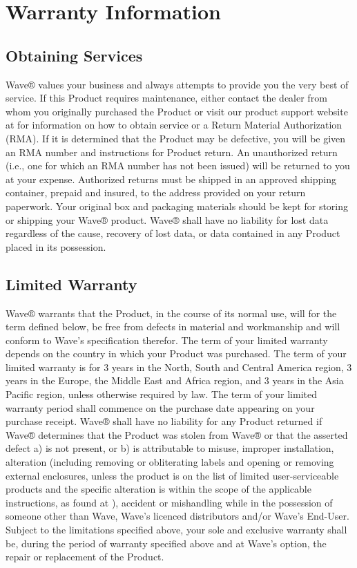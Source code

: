 \documentclass[letterpaper,10pt,english]{sphinxmanual}
\begin{document}
\section{Warranty Information}
\label{\detokenize{warranty:warranty-information}}

\subsection{Obtaining Services}
\label{\detokenize{warranty:obtaining-services}}
Wave® values your business and always attempts to provide you the very best of service. If this Product requires maintenance, either contact the dealer from whom you originally purchased the Product or visit our product support website at  for information on how to obtain service or a Return Material Authorization (RMA). If it is determined that the Product may be defective, you will be given an RMA number and instructions for Product return. An unauthorized return (i.e., one for which an RMA number has not been issued) will be returned to you at your expense. Authorized returns must be shipped in an approved shipping container, prepaid and insured, to the address provided on your return paperwork. Your original box and packaging materials should be kept for storing or shipping your Wave® product.  Wave® shall have no liability for lost data regardless of the cause, recovery of lost data, or data contained in any Product placed in its possession.


\subsection{Limited Warranty}
\label{\detokenize{warranty:limited-warranty}}
Wave® warrants that the Product, in the course of its normal use, will for the term defined below, be free from defects in material and workmanship and will conform to Wave’s specification therefor. The term of your limited warranty depends on the country in which your Product was purchased. The term of your limited warranty is for 3 years in the North, South and Central America region, 3 years in the Europe, the Middle East and Africa region, and 3 years in the Asia Pacific region, unless otherwise required by law. The term of your limited warranty period shall commence on the purchase date appearing on your purchase receipt. Wave® shall have no liability for any Product returned if Wave® determines that the Product was stolen from Wave® or that the asserted defect a) is not present, or b) is attributable to misuse, improper installation, alteration (including removing or obliterating labels and opening or removing external enclosures, unless the product is on the list of limited user-serviceable products and the specific alteration is within the scope of the applicable instructions, as found at ), accident or mishandling while in the possession of someone other than Wave, Wave’s licenced distributors and/or Wave’s End-User. Subject to the limitations specified above, your sole and exclusive warranty shall be, during the period of warranty specified above and at Wave’s option, the repair or replacement of the Product.
\end{document}
